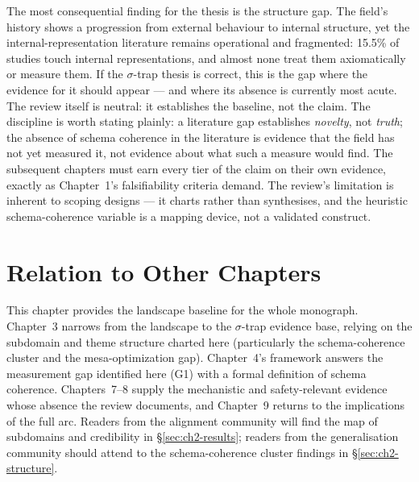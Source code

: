 The most consequential finding for the thesis is the structure gap. The field's
history shows a progression from external behaviour to internal structure, yet the
internal-representation literature remains operational and fragmented: 15.5\% of
studies touch internal representations, and almost none treat them axiomatically or
measure them. If the $\sigma$-trap thesis is correct, this is the gap where the
evidence for it should appear --- and where its absence is currently most acute. The
review itself is neutral: it establishes the baseline, not the claim. The discipline
is worth stating plainly: a literature gap establishes \emph{novelty}, not
\emph{truth}; the absence of schema coherence in the literature is evidence that the
field has not yet measured it, not evidence about what such a measure would find. The
subsequent chapters must earn every tier of the claim on their own evidence, exactly
as Chapter~1's falsifiability criteria demand. The review's limitation is inherent to
scoping designs --- it charts rather than synthesises, and the heuristic
schema-coherence variable is a mapping device, not a validated construct.

\section{Relation to Other Chapters}

This chapter provides the landscape baseline for the whole monograph. Chapter~3
narrows from the landscape to the $\sigma$-trap evidence base, relying on the
subdomain and theme structure charted here (particularly the schema-coherence cluster
and the mesa-optimization gap). Chapter~4's framework answers the measurement gap
identified here (G1) with a formal definition of schema coherence. Chapters~7--8 supply
the mechanistic and safety-relevant evidence whose absence the review documents, and
Chapter~9 returns to the implications of the full arc. Readers from the alignment
community will find the map of subdomains and credibility in \S\ref{sec:ch2-results};
readers from the generalisation community should attend to the schema-coherence
cluster findings in \S\ref{sec:ch2-structure}.
